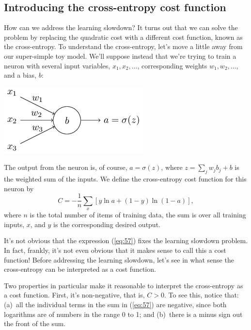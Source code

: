 \documentclass[a4paper,twoside,10pt]{book}
\begin{document}
\subsection{Introducing the cross-entropy cost function}
How can we address the learning slowdown? It turns out that we can solve the problem by replacing the quadratic cost with a different cost function, known as the cross-entropy. To understand the cross-entropy, let's move a little away from our super-simple toy model. We'll suppose instead that we're trying to train a neuron with several input variables, $x_1,x_2,\ldots$, corresponding weights $w_1,w_2,\ldots$, and a bias, $b$:
\begin{center}
	\includegraphics[scale=0.5]{./figures/ch3/tikz29}
\end{center}
The output from the neuron is, of course, $a=\sigma(z)$, where $z=\sum_jw_jb_j+b$ is the weighted sum of the inputs. We define the cross-entropy cost function for this neuron by
\begin{equation}
	C = -\frac{1}{n} \sum_x \left[y \ln a + (1-y ) \ln (1-a) \right],
	\label{eq:57}
\end{equation}
where $n$ is the total number of items of training data, the sum is over all training inputs, $x$, and $y$ is the corresponding desired output.

It's not obvious that the expression (\ref{eq:57}) fixes the learning slowdown problem. In fact, frankly, it's not even obvious that it makes sense to call this a cost function! Before addressing the learning slowdown, let's see in what sense the cross-entropy can be interpreted as a cost function.

Two properties in particular make it reasonable to interpret the cross-entropy as a cost function. First, it's non-negative, that is, $C>0$. To see this, notice that: (a)~all the individual terms in the sum in (\ref{eq:57}) are negative, since both logarithms are of numbers in the range 0 to 1; and (b)~there is a minus sign out the front of the sum.
\end{document}
